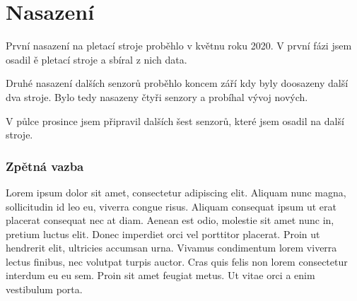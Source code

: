 \chapter{Nasazení}
První nasazení na pletací stroje proběhlo v květnu roku 2020.
V první fázi jsem osadil ě pletací stroje a sbíral z nich data.

Druhé nasazení dalších senzorů proběhlo koncem září kdy byly doosazeny další dva stroje.
Bylo tedy nasazeny čtyři senzory a probíhal vývoj nových.

V půlce prosince jsem připravil dalších šest senzorů, které jsem osadil na další stroje.


\subsection{Zpětná vazba}
Lorem ipsum dolor sit amet, consectetur adipiscing elit.
Aliquam nunc magna, sollicitudin id leo eu, viverra congue risus.
Aliquam consequat ipsum ut erat placerat consequat nec at diam. 
Aenean est odio, molestie sit amet nunc in, pretium luctus elit. 
Donec imperdiet orci vel porttitor placerat. 
Proin ut hendrerit elit, ultricies accumsan urna. 
Vivamus condimentum lorem viverra lectus finibus, nec volutpat turpis auctor.
Cras quis felis non lorem consectetur interdum eu eu sem. 
Proin sit amet feugiat metus. 
Ut vitae orci a enim vestibulum porta. 




\newpage
